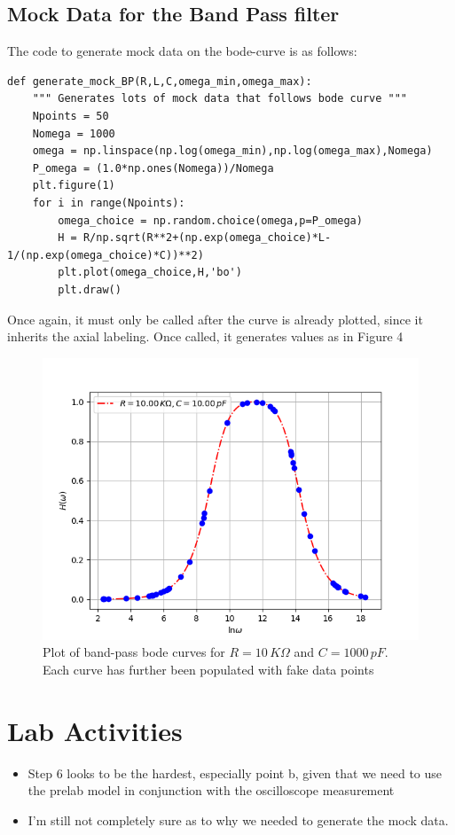 \documentclass[english]{article}
\begin{document}
\subsection{Mock Data for the Band Pass filter}
The code to generate mock data on the bode-curve is as follows:
\begin{lstlisting}
def generate_mock_BP(R,L,C,omega_min,omega_max):
    """ Generates lots of mock data that follows bode curve """
    Npoints = 50
    Nomega = 1000
    omega = np.linspace(np.log(omega_min),np.log(omega_max),Nomega)
    P_omega = (1.0*np.ones(Nomega))/Nomega
    plt.figure(1)
    for i in range(Npoints):
        omega_choice = np.random.choice(omega,p=P_omega)
        H = R/np.sqrt(R**2+(np.exp(omega_choice)*L-1/(np.exp(omega_choice)*C))**2)
        plt.plot(omega_choice,H,'bo')
        plt.draw()
\end{lstlisting}
Once again, it must only be called after the curve is already plotted, since
it inherits the axial labeling. Once called, it generates values as in Figure 4
\begin{figure}
	\centering
	\label{fig:mockbp}
	\includegraphics[scale=0.4]{band_pass_mock.png}
	\caption{Plot of band-pass bode curves for $R=10\,K\Omega$ and $C=1000\,pF$.
	Each curve has further been populated with fake data points}
\end{figure}

\section{Lab Activities}
\begin{itemize}
	\item Step 6 looks to be the hardest, especially point b, given that
		we need to use the prelab model in conjunction with the oscilloscope measurement
	\item I'm still not completely sure as to why we needed to generate the mock data.
\end{itemize}
\end{document}
